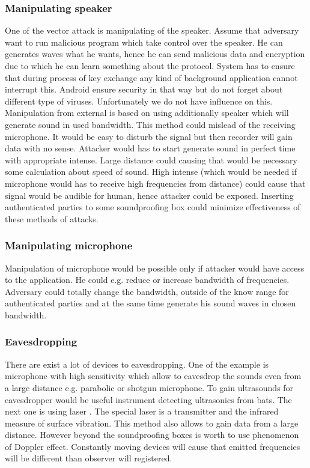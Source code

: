 \documentclass[11pt,titlepage]{article}
\theoremstyle{plain}
\begin{document}
\subsubsection{Manipulating speaker}
One of the vector attack is manipulating of the speaker. Assume that adversary want to run malicious program which take control over the speaker. He can generates waves what he wants, hence he can send malicious data and encryption due to which he can learn something about the protocol. System has to ensure that during process of key exchange any kind of background application cannot interrupt this. Android ensure security in that way but do not forget about different type of viruses. Unfortunately we do not have influence on this. Manipulation from external is based on using additionally speaker which will generate sound in used bandwidth. This method could mislead of the receiving microphone. It would be easy to disturb the signal but then recorder will gain data with no sense. Attacker would has to start generate sound in perfect time with appropriate intense. Large distance could causing that would be necessary some calculation about speed of sound. High intense (which would be needed if microphone would has to receive high frequencies from distance) could cause that signal would be audible for human, hence attacker could be exposed. Inserting authenticated parties to some soundproofing box could minimize effectiveness of these methods of attacks.

\subsubsection{Manipulating microphone}
Manipulation of microphone would be possible only if attacker would have access to the application. He could e.g. reduce or increase bandwidth of frequencies. Adversary could totally change the bandwidth, outside of the know range for authenticated parties and at the same time generate his sound waves in chosen bandwidth.

\subsubsection{Eavesdropping}
There are exist a lot of devices to eavesdropping. One of the example is microphone with high sensitivity which allow to eavesdrop the sounds even from a large distance e.g. parabolic or shotgun  microphone. To gain ultrasounds for eavesdropper would be useful instrument detecting ultrasonics from bats. The next one is using laser \cite{laser_mic}. The special laser is a transmitter and the infrared measure of surface vibration. This method also allows to gain data from a large distance. However beyond the soundproofing boxes is worth to use phenomenon of Doppler effect. Constantly moving devices will cause that emitted frequencies will be different than observer will registered. 
\end{document}
